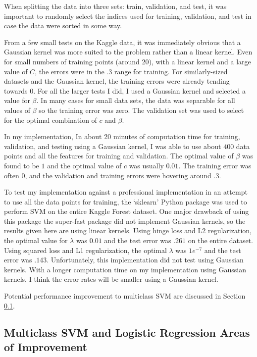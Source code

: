 \documentclass[10pt]{article}
\begin{document}
When splitting the data into three sets: train, validation, and test, it was important to randomly select the indices used for training, validation, and test in case the data were sorted in some way. 

From a few small tests on the Kaggle data, it was immediately obvious that a Gaussian kernel was more suited to the problem rather than a linear kernel. Even for small numbers of training points (around $20$), with a linear kernel and a large value of $C$, the errors were in the $.3$ range for training. For similarly-sized datasets and the Gaussian kernel, the training errors were already tending towards $0$. For all the larger tests I did, I used a Gaussian kernel and selected a value for $\beta$. In many cases for small data sets, the data was separable for all values of $\beta$ so the training error was zero. The validation set was used to select for the optimal combination of $c$ and $\beta$.

In my implementation, In about 20 minutes of computation time for training, validation, and testing using a Gaussian kernel, I was able to use about $400$ data points and all the features for training and validation. The optimal value of $\beta$ was found to be $1$ and the optimal value of $c$ was usually $0.01$. The training error was often $0$, and the validation and training errors were hovering around $.3$. 

To test my implementation against a professional implementation in an attempt to use all the data points for training, the `sklearn' Python package was used to perform SVM on the entire Kaggle Forest dataset. One major drawback of using this package the super-fast package did not implement Gaussian kernels, so the results given here are using linear kernels. Using hinge loss and L2 regularization, the optimal value for $\lambda$ was $0.01$ and the test error was $.261$ on the entire dataset. Using squared loss and L1 regularization, the optimal $\lambda$ was $1e^{-7}$ and the test error was $.143$. Unfortunately, this implementation did not test using Gaussian kernels. With a longer computation time on my implementation using Gaussian kernels, I think the error rates will be smaller using a Gaussian kernel.

Potential performance improvement to multiclass SVM are discussed in Section \ref{sec:improvement}.

\subsection{Multiclass SVM and Logistic Regression Areas of Improvement}
\label{sec:improvement}
\end{document}
